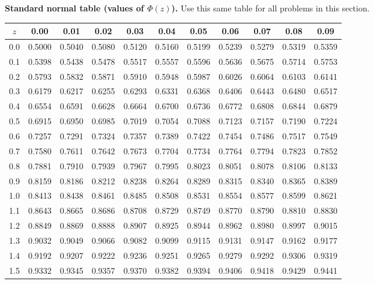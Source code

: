	\noindent\textbf{Standard normal table (values of \(\Phi(z)\)).} Use this same table for all problems in this section.
	\begin{center}
	\begin{tabular}{c|cccccccccc}
		\toprule
		$z$ & 0.00 & 0.01 & 0.02 & 0.03 & 0.04 & 0.05 & 0.06 & 0.07 & 0.08 & 0.09 \\
		\midrule
		0.0 & 0.5000 & 0.5040 & 0.5080 & 0.5120 & 0.5160 & 0.5199 & 0.5239 & 0.5279 & 0.5319 & 0.5359 \\
		0.1 & 0.5398 & 0.5438 & 0.5478 & 0.5517 & 0.5557 & 0.5596 & 0.5636 & 0.5675 & 0.5714 & 0.5753 \\
		0.2 & 0.5793 & 0.5832 & 0.5871 & 0.5910 & 0.5948 & 0.5987 & 0.6026 & 0.6064 & 0.6103 & 0.6141 \\
		0.3 & 0.6179 & 0.6217 & 0.6255 & 0.6293 & 0.6331 & 0.6368 & 0.6406 & 0.6443 & 0.6480 & 0.6517 \\
		0.4 & 0.6554 & 0.6591 & 0.6628 & 0.6664 & 0.6700 & 0.6736 & 0.6772 & 0.6808 & 0.6844 & 0.6879 \\
		0.5 & 0.6915 & 0.6950 & 0.6985 & 0.7019 & 0.7054 & 0.7088 & 0.7123 & 0.7157 & 0.7190 & 0.7224 \\
		0.6 & 0.7257 & 0.7291 & 0.7324 & 0.7357 & 0.7389 & 0.7422 & 0.7454 & 0.7486 & 0.7517 & 0.7549 \\
		0.7 & 0.7580 & 0.7611 & 0.7642 & 0.7673 & 0.7704 & 0.7734 & 0.7764 & 0.7794 & 0.7823 & 0.7852 \\
		0.8 & 0.7881 & 0.7910 & 0.7939 & 0.7967 & 0.7995 & 0.8023 & 0.8051 & 0.8078 & 0.8106 & 0.8133 \\
		0.9 & 0.8159 & 0.8186 & 0.8212 & 0.8238 & 0.8264 & 0.8289 & 0.8315 & 0.8340 & 0.8365 & 0.8389 \\
		1.0 & 0.8413 & 0.8438 & 0.8461 & 0.8485 & 0.8508 & 0.8531 & 0.8554 & 0.8577 & 0.8599 & 0.8621 \\
		1.1 & 0.8643 & 0.8665 & 0.8686 & 0.8708 & 0.8729 & 0.8749 & 0.8770 & 0.8790 & 0.8810 & 0.8830 \\
		1.2 & 0.8849 & 0.8869 & 0.8888 & 0.8907 & 0.8925 & 0.8944 & 0.8962 & 0.8980 & 0.8997 & 0.9015 \\
		1.3 & 0.9032 & 0.9049 & 0.9066 & 0.9082 & 0.9099 & 0.9115 & 0.9131 & 0.9147 & 0.9162 & 0.9177 \\
		1.4 & 0.9192 & 0.9207 & 0.9222 & 0.9236 & 0.9251 & 0.9265 & 0.9279 & 0.9292 & 0.9306 & 0.9319 \\
		1.5 & 0.9332 & 0.9345 & 0.9357 & 0.9370 & 0.9382 & 0.9394 & 0.9406 & 0.9418 & 0.9429 & 0.9441 \\

\end{tabular}
\end{center}
